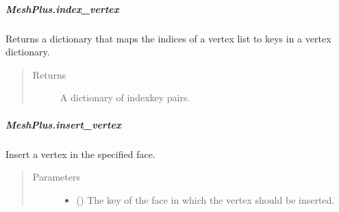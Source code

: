 \documentclass[letterpaper,10pt,english]{sphinxmanual}
\begin{document}
\begin{fulllineitems}
\begin{fulllineitems}
\begin{quote}
\begin{description}
\end{description}\end{quote}

\end{fulllineitems}



\subparagraph{MeshPlus.index\_vertex}
\label{\detokenize{api/generated/directional_clustering.mesh.MeshPlus.index_vertex:meshplus-index-vertex}}\label{\detokenize{api/generated/directional_clustering.mesh.MeshPlus.index_vertex::doc}}

\begin{fulllineitems}
\label{\detokenize{api/generated/directional_clustering.mesh.MeshPlus.index_vertex:directional_clustering.mesh.MeshPlus.index_vertex}}
Returns a dictionary that maps the indices of a vertex list to
keys in a vertex dictionary.
\begin{quote}\begin{description}
\item[{Returns}] \leavevmode
{} \textendash{} A dictionary of index\sphinxhyphen{}key pairs.

\end{description}\end{quote}

\end{fulllineitems}



\subparagraph{MeshPlus.insert\_vertex}
\label{\detokenize{api/generated/directional_clustering.mesh.MeshPlus.insert_vertex:meshplus-insert-vertex}}\label{\detokenize{api/generated/directional_clustering.mesh.MeshPlus.insert_vertex::doc}}

\begin{fulllineitems}
\label{\detokenize{api/generated/directional_clustering.mesh.MeshPlus.insert_vertex:directional_clustering.mesh.MeshPlus.insert_vertex}}
Insert a vertex in the specified face.
\begin{quote}\begin{description}
\item[{Parameters}] \leavevmode\begin{itemize}
\item {} 
 () \textendash{} The key of the face in which the vertex should be inserted.


\end{itemize}
\end{description}
\end{quote}
\end{fulllineitems}
\end{fulllineitems}
\end{document}
